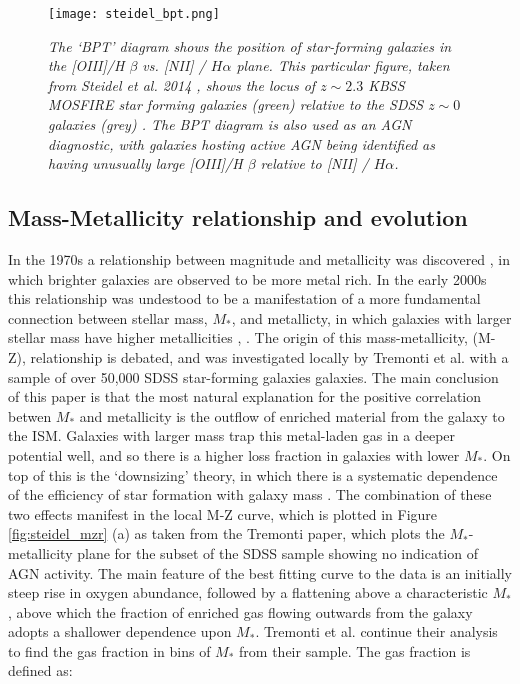\documentclass{literature}
\begin{document}
\begin{figure}[!htp]
\centering
\texttt{[image: steidel\_bpt.png]}
\caption{\footnotesize{\emph{The `BPT' diagram shows the position of star-forming galaxies in the [OIII]/H $\beta$ vs. [NII] / $H\alpha$ plane. This particular figure, taken from Steidel et al. 2014 \citep{Steidel2014}, shows the locus of $z \sim 2.3$ KBSS MOSFIRE star forming galaxies (green) relative to the SDSS $z \sim 0$ galaxies (grey) \citep{Tremonti2004}. The BPT diagram is also used as an AGN diagnostic, with galaxies hosting active AGN being identified as having unusually large [OIII]/H $\beta$ relative to [NII] / $H\alpha$.}}}
\label{fig:steidel_bpt}
\end{figure} 

\subsection{Mass-Metallicity relationship and evolution}\label{subsec:MZ-relation}
In the 1970s a relationship between magnitude and metallicity was discovered \citep{Lequeux1979}, in which brighter galaxies are observed to be more metal rich. In the early 2000s this relationship was undestood to be a manifestation of a more fundamental connection between stellar mass, $M_{*}$, and metallicty, in which galaxies with larger stellar mass have higher metallicities \citep{Garnett2002}, \citep{Tremonti2004}. The origin of this mass-metallicity, (M-Z), relationship is debated, and was investigated locally by Tremonti et al. with a sample of over 50,000 SDSS star-forming galaxies galaxies. The main conclusion of this paper is that the most natural explanation for the positive correlation betwen $M_{*}$ and metallicity is the outflow of enriched material from the galaxy to the ISM. Galaxies with larger mass trap this metal-laden gas in a deeper potential well, and so there is a higher loss fraction in galaxies with lower $M_{*}$. On top of this is the `downsizing' theory, in which there is a systematic dependence of the efficiency of star formation with galaxy mass \citep{Brooks2007}. The combination of these two effects manifest in the local M-Z curve, which is plotted in Figure \ref{fig:steidel_mzr} (a) as taken from the Tremonti paper, which plots the $M_{*}$-metallicity plane for the subset of the SDSS sample showing no indication of AGN activity. The main feature of the best fitting curve to the data is an initially steep rise in oxygen abundance, followed by a flattening above a characteristic $M_{*}$, above which the fraction of enriched gas flowing outwards from the galaxy adopts a shallower dependence upon $M_{*}$. Tremonti et al. continue their analysis to find the gas fraction in bins of $M_{*}$ from their sample. The gas fraction is defined as: 
\end{document}

